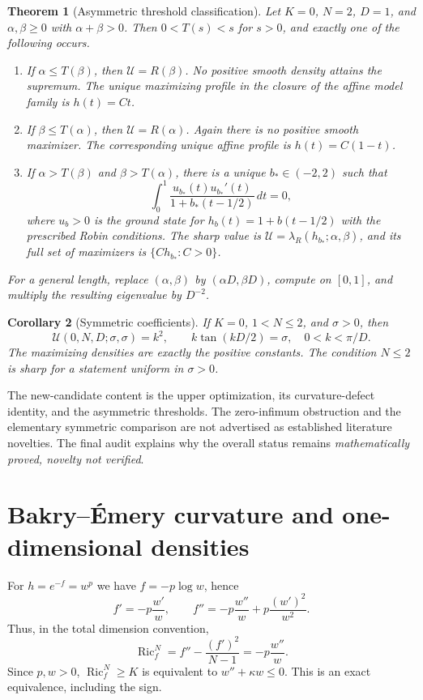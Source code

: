\documentclass[12pt]{amsart}
\newtheorem{thm}{Theorem}[section]
\newtheorem{cor}[thm]{Corollary}
\theoremstyle{definition}
\theoremstyle{remark}
\numberwithin{equation}{section}
\DeclareMathOperator{\Ric}{Ric}
\begin{document}
\begin{thm}[Asymmetric threshold classification]\label{en:phase}
Let $K=0$, $N=2$, $D=1$, and $\alpha,\beta\ge0$ with $\alpha+\beta>0$.
Then $0<T(s)<s$ for $s>0$, and exactly one of the following occurs.
\begin{enumerate}
\item If $\alpha\le T(\beta)$, then $\mathcal U=R(\beta)$. No positive smooth density attains the supremum. The unique maximizing profile in the closure of the affine model family is $h(t)=Ct$.
\item If $\beta\le T(\alpha)$, then $\mathcal U=R(\alpha)$. Again there is no positive smooth maximizer. The corresponding unique affine profile is $h(t)=C(1-t)$.
\item If $\alpha>T(\beta)$ and $\beta>T(\alpha)$, there is a unique $b_*\in(-2,2)$ such that
\begin{equation}\label{en:stationarity}
 \int_0^1\frac{u_{b_*}(t)u_{b_*}'(t)}{1+b_*(t-1/2)}\,dt=0,
\end{equation}
where $u_b>0$ is the ground state for $h_b(t)=1+b(t-1/2)$ with the prescribed Robin conditions. The sharp value is
$\mathcal U=\lambda_R(h_{b_*};\alpha,\beta)$, and its full set of maximizers is
$\{Ch_{b_*}:C>0\}$.
\end{enumerate}
For a general length, replace $(\alpha,\beta)$ by $(\alpha D,\beta D)$, compute on $[0,1]$, and multiply the resulting eigenvalue by $D^{-2}$.
\end{thm}

\begin{cor}[Symmetric coefficients]\label{en:symmetric}
If $K=0$, $1<N\le2$, and $\sigma>0$, then
\[
 \mathcal U(0,N,D;\sigma,\sigma)=k^2,
 \qquad k\tan(kD/2)=\sigma,\quad 0<k<\pi/D.
\]
The maximizing densities are exactly the positive constants. The condition $N\le2$ is sharp for a statement uniform in $\sigma>0$.
\end{cor}

The new-candidate content is the upper optimization, its curvature-defect identity, and the asymmetric thresholds. The zero-infimum obstruction and the elementary symmetric comparison are not advertised as established literature novelties. The final audit explains why the overall status remains \emph{mathematically proved, novelty not verified}.

\section{Bakry--\'Emery curvature and one-dimensional densities}
For $h=e^{-f}=w^p$ we have $f=-p\log w$, hence
\[
 f'=-p\frac{w'}w,\qquad
 f''=-p\frac{w''}w+p\frac{(w')^2}{w^2}.
\]
Thus, in the total dimension convention,
\begin{equation}\label{en:ricci}
 \Ric_f^N=f''-\frac{(f')^2}{N-1}=-p\frac{w''}w.
\end{equation}
Since $p,w>0$, $\Ric_f^N\ge K$ is equivalent to $w''+\kappa w\le0$.
This is an exact equivalence, including the sign.
\end{document}
